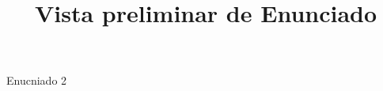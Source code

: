 \documentclass[a4paper,10pt]{article}\usepackage[utf8]{inputenc}\usepackage[spanish]{babel}\usepackage{arial}
\title{Vista preliminar de Enunciado}
\begin{document}
\twocolumn 

\maketitle

Enucniado 2
\end{document}
